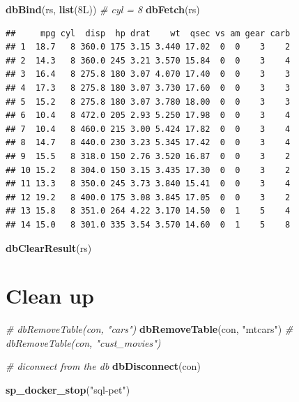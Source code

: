 \documentclass[]{book}
\newenvironment{Shaded}{\begin{snugshade}}{\end{snugshade}}
\newcommand{\CommentTok}[1]{\textcolor[rgb]{0.56,0.35,0.01}{\textit{#1}}}
\newcommand{\KeywordTok}[1]{\textcolor[rgb]{0.13,0.29,0.53}{\textbf{#1}}}
\newcommand{\NormalTok}[1]{#1}
\newcommand{\StringTok}[1]{\textcolor[rgb]{0.31,0.60,0.02}{#1}}
\theoremstyle{definition}
\theoremstyle{definition}
\theoremstyle{definition}
\theoremstyle{remark}
\begin{document}
\begin{Shaded}
\begin{Highlighting}[]
\KeywordTok{dbBind}\NormalTok{(rs, }\KeywordTok{list}\NormalTok{(8L)) }\CommentTok{# cyl = 8}
\KeywordTok{dbFetch}\NormalTok{(rs)}
\end{Highlighting}
\end{Shaded}

\begin{verbatim}
##     mpg cyl  disp  hp drat    wt  qsec vs am gear carb
## 1  18.7   8 360.0 175 3.15 3.440 17.02  0  0    3    2
## 2  14.3   8 360.0 245 3.21 3.570 15.84  0  0    3    4
## 3  16.4   8 275.8 180 3.07 4.070 17.40  0  0    3    3
## 4  17.3   8 275.8 180 3.07 3.730 17.60  0  0    3    3
## 5  15.2   8 275.8 180 3.07 3.780 18.00  0  0    3    3
## 6  10.4   8 472.0 205 2.93 5.250 17.98  0  0    3    4
## 7  10.4   8 460.0 215 3.00 5.424 17.82  0  0    3    4
## 8  14.7   8 440.0 230 3.23 5.345 17.42  0  0    3    4
## 9  15.5   8 318.0 150 2.76 3.520 16.87  0  0    3    2
## 10 15.2   8 304.0 150 3.15 3.435 17.30  0  0    3    2
## 11 13.3   8 350.0 245 3.73 3.840 15.41  0  0    3    4
## 12 19.2   8 400.0 175 3.08 3.845 17.05  0  0    3    2
## 13 15.8   8 351.0 264 4.22 3.170 14.50  0  1    5    4
## 14 15.0   8 301.0 335 3.54 3.570 14.60  0  1    5    8
\end{verbatim}

\begin{Shaded}
\begin{Highlighting}[]
\KeywordTok{dbClearResult}\NormalTok{(rs)}
\end{Highlighting}
\end{Shaded}

\hypertarget{clean-up-2}{%
\section{Clean up}\label{clean-up-2}}

\begin{Shaded}
\begin{Highlighting}[]
\CommentTok{# dbRemoveTable(con, "cars")}
\KeywordTok{dbRemoveTable}\NormalTok{(con, }\StringTok{"mtcars"}\NormalTok{)}
\CommentTok{# dbRemoveTable(con, "cust_movies")}

\CommentTok{# diconnect from the db}
\KeywordTok{dbDisconnect}\NormalTok{(con)}

\KeywordTok{sp_docker_stop}\NormalTok{(}\StringTok{"sql-pet"}\NormalTok{)}
\end{Highlighting}
\end{Shaded}
\end{document}
